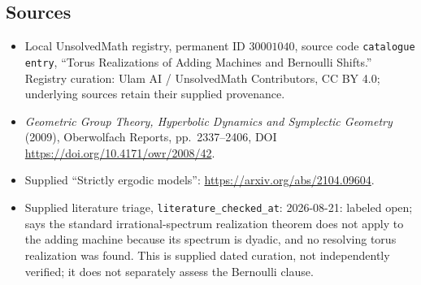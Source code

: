 \documentclass[11pt]{article}
\begin{document}
\subsection{Sources}
\begin{itemize}
\item Local UnsolvedMath registry, permanent ID \(30001040\), source code \texttt{catalogue entry}, ``Torus Realizations of Adding Machines and Bernoulli Shifts.'' Registry curation: Ulam AI / UnsolvedMath Contributors, CC BY 4.0; underlying sources retain their supplied provenance.
\item \emph{Geometric Group Theory, Hyperbolic Dynamics and Symplectic Geometry} (2009), Oberwolfach Reports, pp.\ 2337--2406, DOI \url{https://doi.org/10.4171/owr/2008/42}.
\item Supplied ``Strictly ergodic models'': \url{https://arxiv.org/abs/2104.09604}.
\item Supplied literature triage, \texttt{literature\_checked\_at}: 2026-08-21: labeled open; says the standard irrational-spectrum realization theorem does not apply to the adding machine because its spectrum is dyadic, and no resolving torus realization was found. This is supplied dated curation, not independently verified; it does not separately assess the Bernoulli clause.
\end{itemize}
\end{document}
